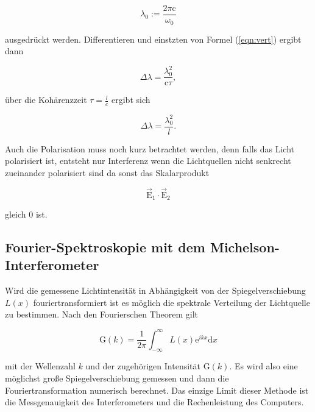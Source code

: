         \begin{equation}
            \lambda_0 := \frac{2 \pi \text{c}}{\omega_0}
        \end{equation}

        \noindent ausgedrückt werden. Differentieren und einstzten von Formel (\ref{eqn:vert}) ergibt dann 

        \begin{equation}
            \Delta \lambda = \frac{\lambda_0^2}{\text{c}\tau}, 
        \end{equation}

        \noindent über die Kohärenzzeit $\tau = \frac{l}{c}$ ergibt sich 

        \begin{equation}
            \Delta \lambda = \frac{\lambda_0^2}{l}.
        \end{equation}

        \noindent Auch die Polarisation muss noch kurz betrachtet werden, denn falls das Licht polarisiert ist, entsteht nur Interferenz 
        wenn die Lichtquellen nicht senkrecht zueinander polarisiert sind da sonst das Skalarprodukt 
     
        \begin{equation}
            \vec{\text{E}}_1 \cdot \vec{\text{E}}_2 
        \end{equation}

        \noindent gleich 0 ist.

    \subsection{Fourier-Spektroskopie mit dem Michelson-Interferometer}

            \noindent Wird die gemessene Lichtintensität in Abhängigkeit von der Spiegelverschiebung $L(x)$ fouriertransformiert ist es möglich 
            die spektrale Verteilung der Lichtquelle zu bestimmen. Nach den Fourierschen Theorem gilt 

            \begin{equation*}
                 \text{G}(k) = \frac{1}{2\pi} \int_{- \infty}^{\infty} L(x) \text{e}^{ikx} \text{d}x
            \end{equation*}

            \noindent mit der Wellenzahl $k$ und der zugehörigen Intensität G$(k)$. Es wird also eine möglichst große Spiegelverschiebung gemessen 
            und dann die Fouriertransformation numerisch berechnet. Das einzige Limit dieser Methode ist die Messgenauigkeit des Interferometers und 
            die Rechenleistung des Computers.

